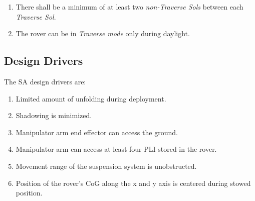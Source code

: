 \begin{enumerate}[label=\textbf{\textcolor{BulletBlue}{C-\arabic*}}]
    \item There shall be a minimum of at least two \textit{non-Traverse Sols} between each \textit{Traverse Sol}.
    \item \label{itm:con:daylight_traverse} The rover can be in \textit{Traverse mode} only during daylight.
\end{enumerate}

\subsection{Design Drivers}
\label{sec:Design:RequirementsAndDesignDrivers:DesignDrivers}
The \ac{SA} design drivers are:

\begin{enumerate}[leftmargin=1.31cm,label=\textbf{\textcolor{BulletBlue}{DD-\arabic*}}]
    \item \label{itm:dd:limited_unfolding} Limited amount of unfolding during deployment.
    \item \label{itm:dd:shadowing} Shadowing is minimized.
    \item \label{itm:dd:end_effector} Manipulator arm end effector can access the ground.
    \item \label{itm:dd:four_plis} Manipulator arm can access at least four \ac{PLI} stored in the rover.
    \item \label{itm:dd:unobstructed} Movement range of the suspension system is unobstructed.
    \item \label{itm:dd:cog} Position of the rover's \ac{CoG} along the x and y axis is centered during stowed position.
\end{enumerate}

